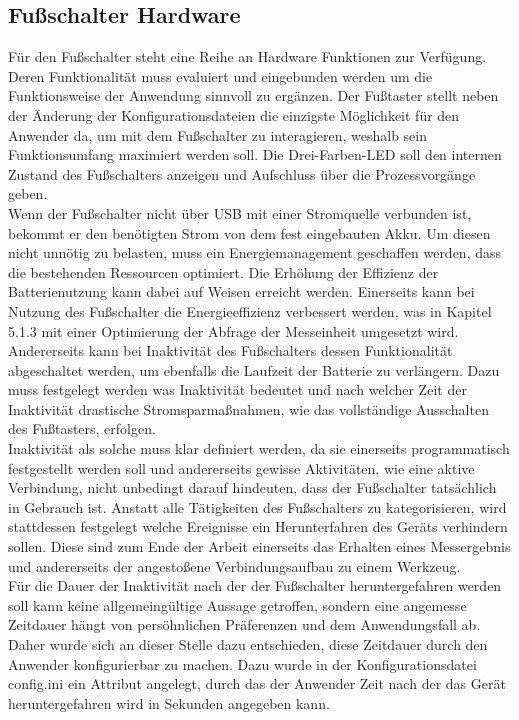 \subsection{Fußschalter Hardware}
Für den Fußschalter steht eine Reihe an Hardware Funktionen zur Verfügung. Deren Funktionalität muss evaluiert und eingebunden werden um die Funktionsweise der Anwendung sinnvoll zu ergänzen. Der Fußtaster stellt neben der Änderung der Konfigurationsdateien die einzigste Möglichkeit für den Anwender da, um mit dem Fußschalter zu interagieren, weshalb sein Funktionsumfang maximiert werden soll. Die Drei-Farben-LED soll den internen Zustand des Fußschalters anzeigen und Aufschluss über die Prozessvorgänge geben.\\
Wenn der Fußschalter nicht über \ac{USB} mit einer Stromquelle verbunden ist, bekommt er den benötigten Strom von dem fest eingebauten Akku. Um diesen nicht unnötig zu belasten, muss ein Energiemanagement geschaffen werden, dass die bestehenden Ressourcen optimiert. Die Erhöhung der Effizienz der Batterienutzung kann dabei auf Weisen erreicht werden. Einerseits kann bei Nutzung des Fußschalter die Energieeffizienz verbessert werden, was in Kapitel 5.1.3 mit einer Optimierung der Abfrage der Messeinheit umgesetzt wird. Andererseits kann bei Inaktivität des Fußschalters dessen Funktionalität abgeschaltet werden, um ebenfalls die Laufzeit der Batterie zu verlängern. Dazu muss festgelegt werden was Inaktivität bedeutet und nach welcher Zeit der Inaktivität drastische Stromsparmaßnahmen, wie das vollständige Ausschalten des Fußtasters, erfolgen.\\
Inaktivität als solche muss klar definiert werden, da sie einerseits programmatisch festgestellt werden soll und andererseits gewisse Aktivitäten, wie eine aktive Verbindung, nicht unbedingt darauf hindeuten, dass der Fußschalter tatsächlich in Gebrauch ist. Anstatt alle Tätigkeiten des Fußschalters zu kategorisieren, wird stattdessen festgelegt welche Ereignisse ein Herunterfahren des Geräts verhindern sollen. Diese sind zum Ende der Arbeit einerseits das Erhalten eines Messergebnis und andererseits der angestoßene Verbindungsaufbau zu einem Werkzeug.\\
Für die Dauer der Inaktivität nach der der Fußschalter heruntergefahren werden soll kann keine allgemeingültige Aussage getroffen, sondern eine angemesse Zeitdauer hängt von persöhnlichen Präferenzen und dem Anwendungsfall ab. Daher wurde sich an dieser Stelle dazu entschieden, diese Zeitdauer durch den Anwender konfigurierbar zu machen. Dazu wurde in der Konfigurationsdatei config.ini ein Attribut angelegt, durch das der Anwender Zeit nach der das Gerät heruntergefahren wird in Sekunden angegeben kann.\\
